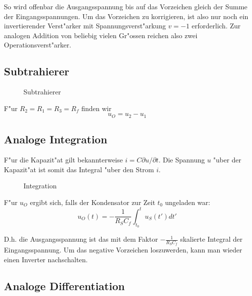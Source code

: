 \documentclass[german, 10pt, a4paper, headsepline]{scrreprt}
\theoremstyle{remark}
\begin{document}
So wird offenbar die Ausgangsspannung bis auf das Vorzeichen gleich der Summe der Eingangsspannungen. Um das Vorzeichen zu korrigieren, ist also nur noch ein invertierender Verst"arker mit Spannungsverst"arkung $v=-1$ erforderlich. Zur analogen Addition von beliebig vielen Gr"ossen reichen also zwei Operationsverst"arker.

\pagebreak

\subsection{Subtrahierer}

\begin{figure}[htb]
 
 \centerline{\box\graph}
 \caption{Subtrahierer}
 \label{opamp_sub}
\end{figure}

F"ur $R_2 = R_1 = R_3 = R_f$ finden wir
\begin{displaymath}
	u_O = u_2 - u_1
\end{displaymath}

\subsection{Analoge Integration}

F"ur die Kapazit"at gilt bekannterweise $i = C \partial u / \partial t$. Die Spannung $u$ "uber der Kapazit"at ist somit das Integral "uber den Strom $i$. 

\begin{figure}[hbt]
 
 \centerline{\box\graph}
 \caption{Integration}
 \label{opamp_int}
\end{figure}

F"ur $u_O$ ergibt sich, falls der Kondensator zur Zeit $t_0$ ungeladen war:
\begin{displaymath}
	u_O(t) = -\frac{1}{R_S C_f}\int^t_{t_0} u_S(t')dt'
\end{displaymath}

D.h. die Ausgangsspannung ist das mit dem Faktor $-\frac{1}{R_S C_f}$ skalierte Integral der Eingangsspannung. Um das negative Vorzeichen loszuwerden, kann man wieder einen Inverter nachschalten.

\pagebreak

\subsection{Analoge Differentiation}
\end{document}

